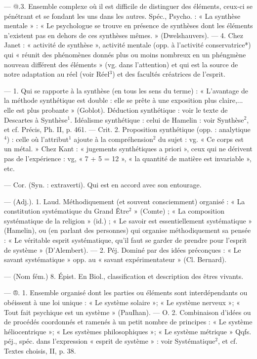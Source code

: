 \begin{itemize}[leftmargin=1cm, label=, itemsep=1pt]
— @.3. Ensemble complexe où il
est difficile de distinguer des éléments, ceux-ci se pénétrant et se
fondant les uns dans les autres.
Spéc., Psycho. : « La synthèse mentale » : « Le psychologue se trouve
en présence de synthèses dont les
éléments n'existent pas en dehors
de ces synthèses mêmes. » (Dwelshauvers). — 4. Chez Janet : « activité
de synthèse », activité mentale
(opp. à l’activité conservatrice*) qui
« réunit des phénomènes donnés
plus ou moins nombreux en un phéngmène nouveau différent des éléments » (vg. dans l'attention) et qui
est la source de notre adaptation au
réel (voir Réel$^3$) et des facultés créatrices de l'esprit.

 — 1. Qui se rapporte à
la synthèse (en tous les sens du
terme) : « L'avantage de la méthode
synthétique est double : elle se
prête à une exposition plus claire,...
elle est plus probante » (Goblot).
Déduction synthétique : voir le texte
de Descartes à Synthèse$^1$. Idéalisme
synthétique : celui de Hamelin : voir
Synthèse$^2$, et cf. Précis, Ph. II,
p. 461.
— Crit. 2. Proposition synthétique (opp. : analytique$^4$) : celle où
l’attribut$^1$ ajoute à la compréhension$^2$ du sujet : vg. « Ce corps est un
métal. » Chez Kant : « jugements
synthétiques a priori », ceux qui ne
dérivent pas de l'expérience : vg,
« 7 + 5 = 12 », « la quantité de
matière est invariable », etc.

 — Cor. (Syn. : extraverti). Qui
est en accord avec son entourage.

 — (Adj.). 1. Laud. Méthodiquement (et souvent consciemment) organisé : « La constitution
systématique du Grand Être$^2$ »
(Comte) ; « La composition systématique de la religion » (id.) ; « Le
savoir est essentiellement systématique » (Hamelin), ou (en parlant
des personnes) qui organise méthodiquement sa pensée : « Le véritable
esprit systématique, qu'il faut se
garder de prendre pour l'esprit de
système » (D'Alembert). — 2. Péj.
Dominé par des idées préconçues :
« Le savant systématique » opp. au
« savant expérimentateur » (Cl. Bernard).

— (Nom fém.) 8. Épist. En Biol.,
classification et description des
êtres vivants.

 — ®. 1. Ensemble organisé
dont les parties ou éléments sont
interdépendants ou obéissent à une
loi unique : « Le système solaire »;
« Le système nerveux »; « Tout fait
psychique est un système » (PauIhan). — O. 2. Combinaison d'idées
ou de procédés coordonnés et ramenés à un petit nombre de principes :
« Le système héliocentrique »; « Les
systèmes philosophiques »; « Le
système métrique » Qqfs. péj., spéc.
dans l'expression « esprit de système » : voir Systématique$^2$, et cf.
Textes choisis, II, p. 38.

	\end{itemize}
